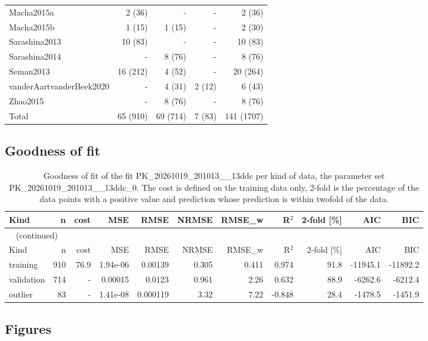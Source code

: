 \documentclass{article}
\begin{document}
\begin{longtable}{lrrrr}
Macha2015a & 2 (36) & - & - & 2 (36) \\
Macha2015b & 1 (15) & 1 (15) & - & 2 (30) \\
Sarashina2013 & 10 (83) & - & - & 10 (83) \\
Sarashina2014 & - & 8 (76) & - & 8 (76) \\
Seman2013 & 16 (212) & 4 (52) & - & 20 (264) \\
vanderAartvanderBeek2020 & - & 4 (31) & 2 (12) & 6 (43) \\
Zhao2015 & - & 8 (76) & - & 8 (76) \\
Total & 65 (910) & 69 (714) & 7 (83) & 141 (1707) \\
\end{longtable}

\subsection{Goodness of fit}

\begin{longtable}{lrrrrrrrrrr}
\caption{Goodness of fit of the fit PK\_20261019\_201013\_\_13ddc per kind of data, the parameter set PK\_20261019\_201013\_\_13ddc\_0. The cost is defined on the training data only, 2-fold is the percentage of the data points with a positive value and prediction whose prediction is within twofold of the data.}\label{tab:metrics:PK_20261019_201013__13ddc} \\
\toprule
Kind & n & cost & MSE & RMSE & NRMSE & RMSE\_w & R\ensuremath{^{2}} & 2-fold [\%] & AIC & BIC \\
\midrule
\endfirsthead
\multicolumn{11}{l}{\small\tablename~\thetable{} (continued)} \\
\toprule
Kind & n & cost & MSE & RMSE & NRMSE & RMSE\_w & R\ensuremath{^{2}} & 2-fold [\%] & AIC & BIC \\
\midrule
\endhead
\bottomrule
\endlastfoot
training & 910 & 76.9 & 1.94e-06 & 0.00139 & 0.305 & 0.411 & 0.974 & 91.8 & -11945.1 & -11892.2 \\
validation & 714 & - & 0.00015 & 0.0123 & 0.961 & 2.26 & 0.632 & 88.9 & -6262.6 & -6212.4 \\
outlier & 83 & - & 1.41e-08 & 0.000119 & 3.32 & 7.22 & -0.848 & 28.4 & -1478.5 & -1451.9 \\
\end{longtable}

\subsection{Figures}
\end{document}
